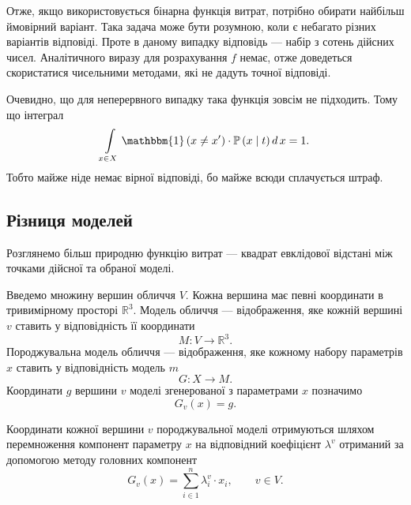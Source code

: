 Отже, якщо використовується бінарна функція витрат,
потрібно обирати найбільш ймовірний варіант.
Така задача може бути розумною, коли є небагато різних варіантів відповіді.
Проте в даному випадку відповідь --- набір з сотень дійсних чисел.
Аналітичного виразу для розрахування $f$ немає,
отже доведеться скористатися чисельними методами,
які не дадуть точної відповіді.

Очевидно,
що для неперервного випадку така функція зовсім не підходить.
Тому що інтеграл
\begin{equation*}
  \int\limits_{x \in X} \mathbbm{1} \left( x \neq x' \right)
  \cdot \mathbb{P} \left( x \;\middle|\;  t \right) d\, x = 1.
\end{equation*}
Тобто майже ніде немає вірної відповіді, бо майже всюди сплачується штраф.

\subsection{Різниця моделей}

Розглянемо більш природню функцію витрат ---
квадрат евклідової відстані між точками дійсної та обраної моделі.

Введемо множину вершин обличчя $V$.
Кожна вершина має певні координати в тривимірному просторі $\mathbb{R}^3$.
Модель обличчя --- відображення,
яке кожній вершині $v$ ставить у відповідність її координати
\begin{equation*}
  M: V \rightarrow \mathbb{R}^3.
\end{equation*}
Породжувальна модель обличчя --- відображення,
яке кожному набору параметрів $x$ ставить у відповідність модель $m$
\begin{equation*}
  G: X \rightarrow M.
\end{equation*}
Координати $g$ вершини $v$ моделі згенерованої з параметрами $x$ позначимо
\begin{equation*}
  G_v\left( x \right) = g.
\end{equation*}

Координати кожної вершини $v$ породжувальної моделі отримуються шляхом
перемноження компонент параметру $x$ на відповідний коефіцієнт $\lambda^v$
отриманий за допомогою методу головних компонент
\begin{equation*}
  G_v\left( x \right) = \sum_{i \in 1}^n \lambda_i^v \cdot x_i,
  \qquad v \in V.
\end{equation*}


